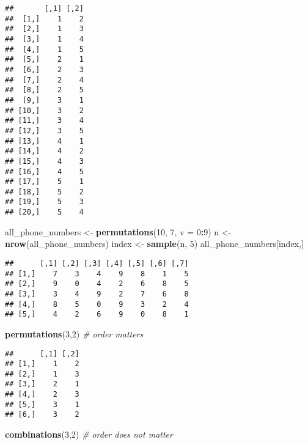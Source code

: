 \documentclass[
]{article}
\newenvironment{Shaded}{\begin{snugshade}}{\end{snugshade}}
\newcommand{\CommentTok}[1]{\textcolor[rgb]{0.56,0.35,0.01}{\textit{#1}}}
\newcommand{\DataTypeTok}[1]{\textcolor[rgb]{0.13,0.29,0.53}{#1}}
\newcommand{\DecValTok}[1]{\textcolor[rgb]{0.00,0.00,0.81}{#1}}
\newcommand{\KeywordTok}[1]{\textcolor[rgb]{0.13,0.29,0.53}{\textbf{#1}}}
\newcommand{\NormalTok}[1]{#1}
\newcommand{\OperatorTok}[1]{\textcolor[rgb]{0.81,0.36,0.00}{\textbf{#1}}}
\newcommand{\StringTok}[1]{\textcolor[rgb]{0.31,0.60,0.02}{#1}}
\begin{document}
\begin{verbatim}
##       [,1] [,2]
##  [1,]    1    2
##  [2,]    1    3
##  [3,]    1    4
##  [4,]    1    5
##  [5,]    2    1
##  [6,]    2    3
##  [7,]    2    4
##  [8,]    2    5
##  [9,]    3    1
## [10,]    3    2
## [11,]    3    4
## [12,]    3    5
## [13,]    4    1
## [14,]    4    2
## [15,]    4    3
## [16,]    4    5
## [17,]    5    1
## [18,]    5    2
## [19,]    5    3
## [20,]    5    4
\end{verbatim}

\begin{Shaded}
\begin{Highlighting}[]
\NormalTok{all\_phone\_numbers \textless{}{-}}\StringTok{ }\KeywordTok{permutations}\NormalTok{(}\DecValTok{10}\NormalTok{, }\DecValTok{7}\NormalTok{, }\DataTypeTok{v =} \DecValTok{0}\OperatorTok{:}\DecValTok{9}\NormalTok{)}
\NormalTok{n \textless{}{-}}\StringTok{ }\KeywordTok{nrow}\NormalTok{(all\_phone\_numbers)}
\NormalTok{index \textless{}{-}}\StringTok{ }\KeywordTok{sample}\NormalTok{(n, }\DecValTok{5}\NormalTok{)}
\NormalTok{all\_phone\_numbers[index,]}
\end{Highlighting}
\end{Shaded}

\begin{verbatim}
##      [,1] [,2] [,3] [,4] [,5] [,6] [,7]
## [1,]    7    3    4    9    8    1    5
## [2,]    9    0    4    2    6    8    5
## [3,]    3    4    9    2    7    6    8
## [4,]    8    5    0    9    3    2    4
## [5,]    4    2    6    9    0    8    1
\end{verbatim}

\begin{Shaded}
\begin{Highlighting}[]
\KeywordTok{permutations}\NormalTok{(}\DecValTok{3}\NormalTok{,}\DecValTok{2}\NormalTok{)    }\CommentTok{\# order matters}
\end{Highlighting}
\end{Shaded}

\begin{verbatim}
##      [,1] [,2]
## [1,]    1    2
## [2,]    1    3
## [3,]    2    1
## [4,]    2    3
## [5,]    3    1
## [6,]    3    2
\end{verbatim}

\begin{Shaded}
\begin{Highlighting}[]
\KeywordTok{combinations}\NormalTok{(}\DecValTok{3}\NormalTok{,}\DecValTok{2}\NormalTok{)    }\CommentTok{\# order does not matter}
\end{Highlighting}
\end{Shaded}
\end{document}
